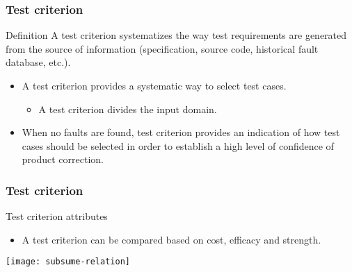 \begin{frame}[hasprev=true, hasnext=true]
\label{concept:test-criterion}
\frametitle{Test criterion}

\begin{block:concept}{Definition}
A test criterion systematizes the way test requirements are
generated from the source of information (specification, source code,
historical fault database, etc.).
\end{block:concept}

\begin{block:fact}{}
\begin{itemize}
	\item A test criterion provides a systematic way to select test cases.
	\begin{itemize}
		\item A test criterion divides the input domain.
	\end{itemize}

	\item When no faults are found, test criterion provides an indication of
	how test cases should be selected in order to establish a high level of
	confidence of product correction.
\end{itemize}
\end{block:fact}


\hfill
{}
\end{frame}


\begin{frame}
\frametitle{Test criterion}

\begin{block:fact}{Test criterion attributes}
\begin{itemize}
	\item A test criterion can be compared based on cost, efficacy and
	strength.
\end{itemize}
\end{block:fact}

\begin{block:fact}{}
    \centering
    \texttt{[image: subsume-relation]}
\end{block:fact}
\end{frame}



